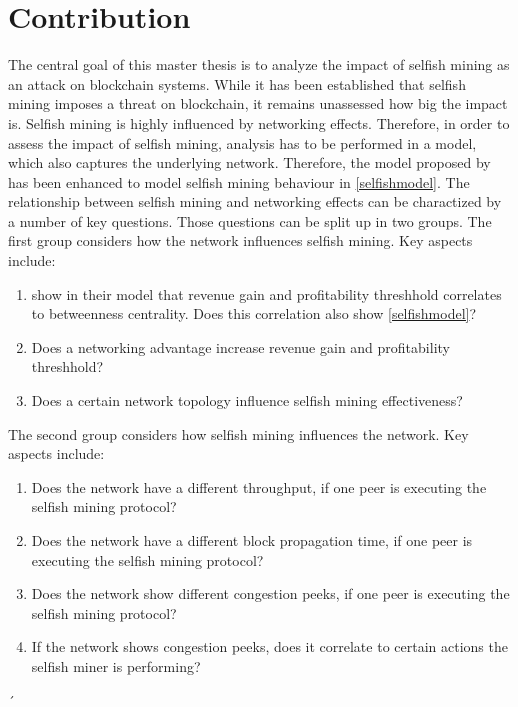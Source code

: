 \chapter{Contribution}\label{chap:contribution}
The central goal of this master thesis is to analyze the impact of selfish mining as an attack on blockchain systems. 
While it has been established that selfish mining imposes a threat on blockchain, it remains unassessed how big the impact is. 
Selfish mining is highly influenced by networking effects. 
Therefore, in order to assess the impact of selfish mining, analysis has to be performed in a model, which also captures the underlying network.
Therefore, the model proposed by \citeauthor{gopalan} has been enhanced to model selfish mining behaviour in \ref{selfishmodel}.
The relationship between selfish mining and networking effects can be charactized by a number of key questions.
Those questions can be split up in two groups.
The first group considers how the network influences selfish mining.
Key aspects include:
\begin{enumerate}
\item \citet{xiao_modeling} show in their model that revenue gain and profitability threshhold correlates to betweenness centrality. Does this correlation also show \ref{selfishmodel}?
\item Does a networking advantage increase revenue gain and profitability threshhold?
\item Does a certain network topology influence selfish mining effectiveness?
\end{enumerate}
The second group considers how selfish mining influences the network.
Key aspects include:
\begin{enumerate}
\item Does the network have a different throughput, if one peer is executing the selfish mining protocol?
\item Does the network have a different block propagation time, if one peer is executing the selfish mining protocol?
\item Does the network show different congestion peeks, if one peer is executing the selfish mining protocol?
\item If the network shows congestion peeks, does it correlate to certain actions the selfish miner is performing?
\end{enumerate}
´






